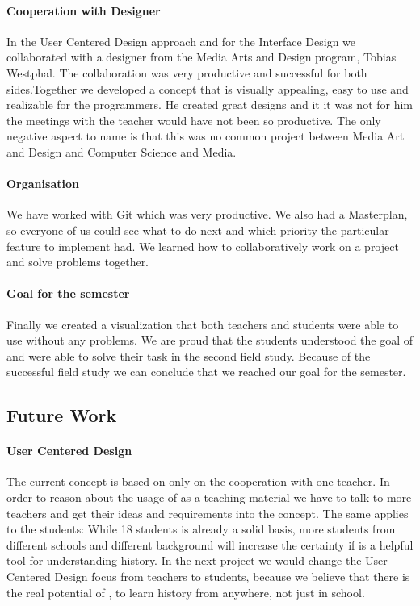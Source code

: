 \paragraph{Cooperation with Designer} %
In the User Centered Design approach and for the Interface Design we collaborated with a designer from the Media Arts and Design program, Tobias Westphal. The collaboration was very productive and successful for both sides.Together we developed a concept that is visually appealing, easy to use and realizable for the programmers. He created great designs and it it was not for him the meetings with the teacher would have not been so productive. The only negative aspect to name is that this was no common project between Media Art and Design and Computer Science and Media.

\paragraph{Organisation} %
We have worked with Git which was very productive. We also had a Masterplan, so everyone of us could see what to do next and which priority the particular feature to implement had. We learned how to collaboratively work on a project and solve problems together.

\paragraph{Goal for the semester} %
Finally we created a visualization that both teachers and students were able to use without any problems. We are proud that the students understood the goal of \HG and were able to solve their task in the second field study. Because of the successful field study we can conclude that we reached our goal for the semester.

\subsection{Future Work} %
\label{sub:future_work}

\paragraph{User Centered Design} %
The current concept is based on only on the cooperation with one teacher. In order to reason about the usage of \HG as a teaching material we have to talk to more teachers and get their ideas and requirements into the concept. The same applies to the students: While 18 students is already a solid basis, more students from different schools and different background will increase the certainty if \HG is a helpful tool for understanding history. In the next project we would change the User Centered Design focus from teachers to students, because we believe that there is the real potential of \HG, to learn history from anywhere, not just in school.

